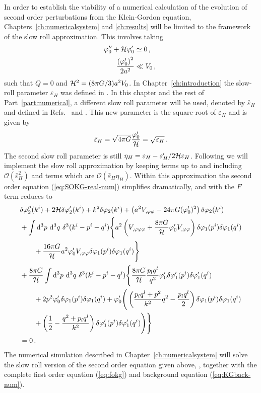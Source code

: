 In order to establish the viability of a numerical calculation of the evolution of
second order perturbations from the
Klein-Gordon equation, Chapters~\ref{ch:numericalsystem} and \ref{ch:results} will be limited to
the framework of the slow roll approximation. 
This involves taking
%
\begin{align}
 \varphi_{0}'' + \mathcal{H} \varphi_{0}' &\simeq 0\,,\quad \\
\frac{\left(\varphi_{0}'\right)^2}{2a^2} &\ll V_{0}\,,
\end{align}
%
such that $Q=0$ and $\mathcal{H}^2 = (8\pi G/3) a^2 V_{0}$. 
In Chapter~\ref{ch:introduction} the slow-roll parameter $\varepsilon_H$ was
defined in . 
In this chapter and the rest of Part~\ref{part:numerical}, a different slow 
roll parameter will be used, denoted by
$\bar{\varepsilon}_H$ and defined in Refs.~\cite{Malik:2006ir} and
\cite{Seery:2005gb}. 
This new parameter is the square-root of $\varepsilon_H$ and is given by
%
\begin{equation}
 \bar{\varepsilon}_H = \sqrt{4\pi G} \frac{\varphi_{0}'}{\mathcal{H}} = \sqrt{\varepsilon_H}\,.
\end{equation}
%
The second slow roll parameter is still $\eta_H = \varepsilon_H -
\varepsilon_H'/2\mathcal{H} \varepsilon_H$. Following  we
will implement the slow roll approximation by keeping terms up to and including
$\mathcal{O}(\bar{\varepsilon}^2_H)$ and terms which are
$\mathcal{O}(\bar{\varepsilon}_H \eta_H)$. 
Within this approximation the second order equation (\ref{eq:SOKG-real-num})
simplifies dramatically, and with the $F$ term reduces to
%
\begin{align}
 \label{eq:KG2-fourier-sr-num}
&\dvp2''(\kvi)+2\H\dvp2'(\kvi)+k^2\dvp2(\kvi)
+\left(a^2
\Upp-{24 \pi G}(\vp_{0}')^2\right)
\dvp2(\kvi) \nonumber\\
%
&+ \int \d^3p\ \d^3q\ \delta^3(\kvi-\pvi-\qvi) \Bigg\{
a^2\left(\Uppp
+ \frac{8\pi G}{\H}\vp_{0}' \Upp\right)
 \dvp1(\pvi)\dvp1(\qvi) \nonumber \\
%
&\qquad +\frac{16\pi G}{\H}a^2
\vp_{0}'\Upp\dvp1(\pvi)\dvp1(\qvi)\Bigg\}
\nonumber \\
%
&+ \frac{8\pi G}{\H}
\int \d^3p\ \d^3q\ \delta^3(\kvi-\pvi-\qvi)  \Bigg\{
%
\frac{8\pi G}{\H}\frac{p_l q^l}{q^2}\vp_{0}'\dvp1'(\pvi)
\dvp1'(\qvi) \nonumber\\
% 
&\qquad+ 2p^2\vp_{0}' \dvp1(\pvi) \dvp1(\qvi)
%
+\vp_{0}'
\Bigg(
\left(\frac{p_lq^l+p^2}{k^2}q^2-\frac{p_lq^l}{2}\right)
\dvp1(\pvi)\dvp1(\qvi) \nonumber \\
% 
&\qquad+\left(\frac{1}{2}-\frac{q^2+p_lq^l}{k^2}\right)
\dvp1'(\pvi)\dvp1'(\qvi)\Bigg)
\Bigg\} \nonumber \\
% 
&=0 \,.
\end{align}
%
The numerical simulation described in Chapter~\ref{ch:numericalsystem} will solve the
slow roll version of the second order equation given above,
, together with the complete first
order equation (\ref{eq:fokg}) and background equation
(\ref{eq:KGback-num}). 
% 
% 
% 
% 
